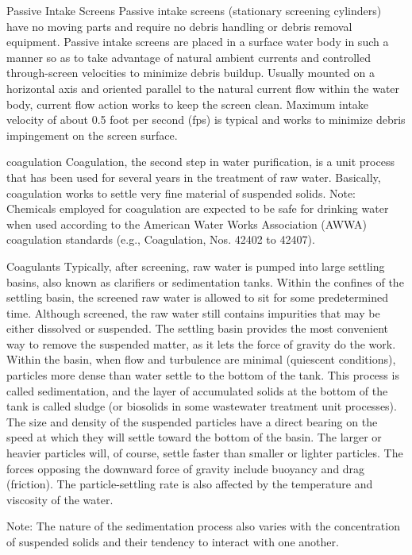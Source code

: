 \documentclass{article}
\begin{document}
Passive Intake Screens Passive intake screens (stationary screening
cylinders) have no moving parts and require no debris handling or debris
removal equipment. Passive intake screens are placed in a surface water
body in such a manner so as to take advantage of natural ambient
currents and controlled through-screen velocities to minimize debris
buildup. Usually mounted on a horizontal axis and oriented parallel to
the natural current flow within the water body, current flow action
works to keep the screen clean. Maximum intake velocity of about 0.5
foot per second (fps) is typical and works to minimize debris
impingement on the screen surface.

coagulation Coagulation, the second step in water purification, is a
unit process that has been used for several years in the treatment of
raw water. Basically, coagulation works to settle very fine material of
suspended solids. Note: Chemicals employed for coagulation are expected
to be safe for drinking water when used according to the American Water
Works Association (AWWA) coagulation standards (e.g., Coagulation, Nos.
42402 to 42407).

Coagulants Typically, after screening, raw water is pumped into large
settling basins, also known as clarifiers or sedimentation tanks. Within
the confines of the settling basin, the screened raw water is allowed to
sit for some predetermined time. Although screened, the raw water still
contains impurities that may be either dissolved or suspended. The
settling basin provides the most convenient way to remove the suspended
matter, as it lets the force of gravity do the work. Within the basin,
when flow and turbulence are minimal (quiescent conditions), particles
more dense than water settle to the bottom of the tank. This process is
called sedimentation, and the layer of accumulated solids at the bottom
of the tank is called sludge (or biosolids in some wastewater treatment
unit processes). The size and density of the suspended particles have a
direct bearing on the speed at which they will settle toward the bottom
of the basin. The larger or heavier particles will, of course, settle
faster than smaller or lighter particles. The forces opposing the
downward force of gravity include buoyancy and drag (friction). The
particle-settling rate is also affected by the temperature and viscosity
of the water.

Note: The nature of the sedimentation process also varies with the
concentration of suspended solids and their tendency to interact with
one another.
\end{document}
